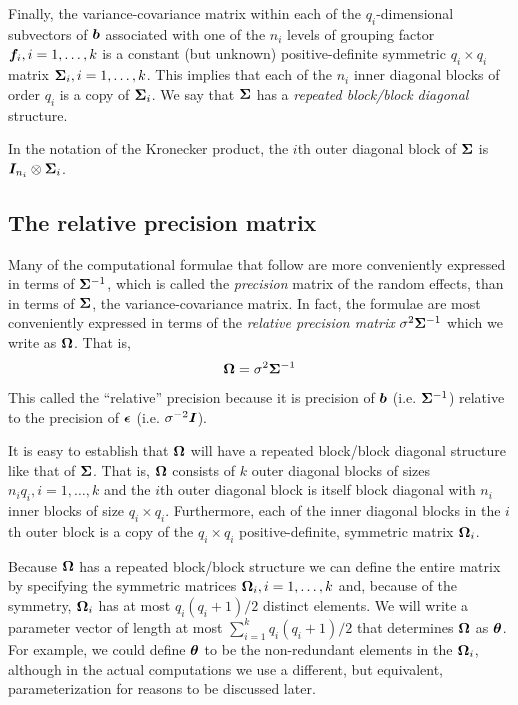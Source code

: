 \documentclass[12pt]{article}
\begin{document}
Finally, the variance-covariance matrix within each of the
$q_i$-dimensional subvectors of $\bm{b}$ associated with one of the $n_i$
levels of grouping factor $\bm{f}_i, i=1,\dots,k$ is a constant (but
unknown) positive-definite symmetric $q_i\times q_i$ matrix
$\bm{\Sigma}_i,i=1,\dots,k$.  This implies that each of the $n_i$ inner
diagonal blocks of order $q_i$ is a copy of $\bm{\Sigma}_i$.  We say that
$\bm{\Sigma}$ has a \emph{repeated block/block diagonal} structure.

In the notation of the Kronecker product, the $i$th outer diagonal
block of $\bm{\Sigma}$ is $\bm{I}_{n_i}\otimes\bm{\Sigma}_i$.

\subsection{The relative precision matrix}
\label{sec:relativePrecision}

Many of the computational formulae that follow are more conveniently
expressed in terms of $\bm{\Sigma}^{-1}$, which is called the
\emph{precision} matrix of the random effects, than in terms of
$\bm{\Sigma}$, the variance-covariance matrix.  In fact, the formulae are
most conveniently expressed in terms of the \emph{relative precision
  matrix} $\sigma^2\bm{\Sigma}^{-1}$ which we write as $\bm{\Omega}$.  That
is,
\begin{equation}
  \label{eq:relPrec}
  \bm{\Omega} = \sigma^2\bm{\Sigma}^{-1}
\end{equation}

This called the ``relative'' precision because it is precision of
$\bm{b}$ (i.e.{} $\bm{\Sigma}^{-1}$) relative to the precision of $\bm{\epsilon}$
(i.e.{} $\sigma^{-2}\bm{I}$).

It is easy to establish that $\bm{\Omega}$ will have a repeated
block/block diagonal structure like that of $\bm{\Sigma}$.  That is,
$\bm{\Omega}$ consists of $k$ outer diagonal blocks of sizes $n_i q_i, i =
1,\dots,k$ and the $i$th outer diagonal block is itself block diagonal
with $n_i$ inner blocks of size $q_i\times q_i$.  Furthermore, each of
the inner diagonal blocks in the $i$th outer block is a copy of the
$q_i\times q_i$ positive-definite, symmetric matrix $\bm{\Omega}_i$.

Because $\bm{\Omega}$ has a repeated block/block structure we can define
the entire matrix by specifying the symmetric matrices $\bm{\Omega}_i, i =
1,\dots,k$ and, because of the symmetry, $\bm{\Omega}_i$ has at most
$q_i(q_i+1)/2$ distinct elements.  We will write a parameter vector of
length at most $\sum_{i=1}^{k}q_i(q_i+1)/2$ that determines $\bm{\Omega}$
as $\bm{\theta}$.  For example, we could define $\bm{\theta}$ to be the
non-redundant elements in the $\bm{\Omega}_i$, although in the actual
computations we use a different, but equivalent, parameterization for
reasons to be discussed later.
\end{document}
